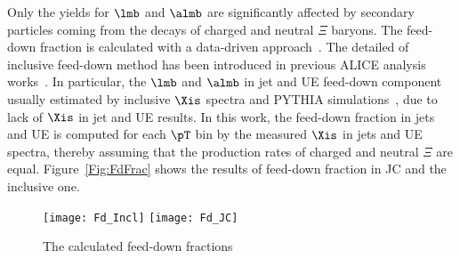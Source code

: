 Only the yields for $\lmb$ and $\almb$ are significantly affected by secondary particles coming from the decays of charged and neutral $\Xi$ baryons. The feed-down fraction is calculated with a data-driven approach~\cite{Abelev:2013haa}. The detailed of inclusive feed-down method has been introduced in previous ALICE analysis works~\cite{Acharya:2019kyh, Acharya:2020uxl, ALICE:2017jyt}. In particular, the $\lmb$ and $\almb$ in jet and UE feed-down component usually estimated by inclusive $\Xis$ spectra and PYTHIA simulations~\cite{V0injet}, due to lack of $\Xis$ in jet and UE results. In this work, the feed-down fraction in jets and UE is computed for each $\pT$ bin by the measured $\Xis$ in jets and UE spectra, thereby assuming that the production rates of charged and neutral $\Xi$ are equal. Figure~\ref{Fig:FdFrac} shows the results of feed-down fraction in JC and the inclusive one.
 \begin{figure}[!ht]
 	\begin{center}
 		\texttt{[image: Fd\_Incl]}
 		\texttt{[image: Fd\_JC]}
 	\end{center}
 	\caption{The calculated feed-down fractions}
 	\label{fig:FdFrac}
 \end{figure}

